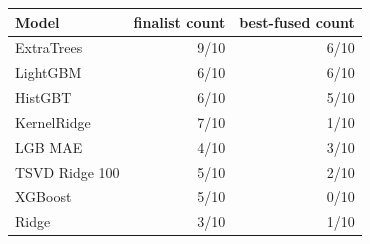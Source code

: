 \begin{tabular}{lrr}
\toprule
Model & finalist count & best-fused count \\
\midrule
ExtraTrees & 9/10 & 6/10 \\
LightGBM & 6/10 & 6/10 \\
HistGBT & 6/10 & 5/10 \\
KernelRidge & 7/10 & 1/10 \\
LGB MAE & 4/10 & 3/10 \\
TSVD Ridge 100 & 5/10 & 2/10 \\
XGBoost & 5/10 & 0/10 \\
Ridge & 3/10 & 1/10 \\
\bottomrule
\end{tabular}